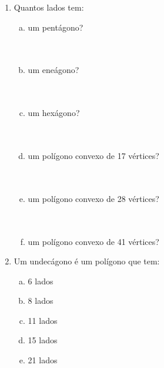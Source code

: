 \documentclass[a4paper,14pt]{article}
\begin{document}
\begin{multicols}{2}
\begin{enumerate}
\begin{enumerate}[a)]
			\end{enumerate}
			\item Quantos lados tem:
			\begin{enumerate}[a)]
				\item um pentágono? \\\\\\
				\item um eneágono? \\\\\\
				\item um hexágono? \\\\\\
				\item um polígono convexo de 17 vértices? \\\\\\
				\item um polígono convexo de 28 vértices? \\\\\\
				\item um polígono convexo de 41 vértices?
			\end{enumerate}
			\item Um undecágono é um polígono que tem:
			\begin{enumerate}[a)]
				\item 6 lados
				\item 8 lados
				\item 11 lados
				\item 15 lados
				\item 21 lados
			\end{enumerate}
		\end{enumerate}
	\end{multicols}
\end{document}
